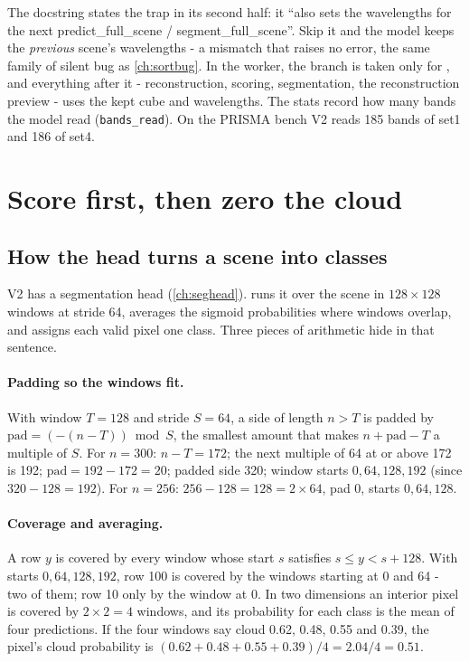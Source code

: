 The docstring states the trap in its second half: it ``also sets the wavelengths for the next predict\_full\_scene /
segment\_full\_scene''. Skip it and the model keeps the \emph{previous} scene's wavelengths - a mismatch that raises no
error, the same family of silent bug as \cref{ch:sortbug}. In the worker, the branch is taken only for
, and everything after it - reconstruction, scoring, segmentation, the reconstruction
preview - uses the kept cube and wavelengths. The stats record how many bands the model read (\texttt{bands\_read}).
On the PRISMA bench V2 reads 185 bands of set1 and 186 of set4.

\section{Score first, then zero the cloud}\label{sec:shipping:order}

\subsection{How the head turns a scene into classes}

V2 has a segmentation head (\cref{ch:seghead}).  runs it over the scene in $128 \times 128$
windows at stride 64, averages the sigmoid probabilities where windows overlap, and assigns each valid pixel one class.
Three pieces of arithmetic hide in that sentence.

\paragraph{Padding so the windows fit.} With window $T = 128$ and stride $S = 64$, a side of length $n > T$ is padded
by $\text{pad} = (-(n - T)) \bmod S$, the smallest amount that makes $n + \text{pad} - T$ a multiple of $S$. For $n =
300$: $n - T = 172$; the next multiple of 64 at or above 172 is 192; $\text{pad} = 192 - 172 = 20$; padded side 320;
window starts $0, 64, 128, 192$ (since $320 - 128 = 192$). For $n = 256$: $256 - 128 = 128 = 2 \times 64$, pad 0,
starts $0, 64, 128$\tagC.

\paragraph{Coverage and averaging.} A row $y$ is covered by every window whose start $s$ satisfies $s \le y < s + 128$.
With starts $0, 64, 128, 192$, row 100 is covered by the windows starting at 0 and 64 - two of them; row 10 only by the
window at 0. In two dimensions an interior pixel is covered by $2 \times 2 = 4$ windows, and its probability for each
class is the mean of four predictions. If the four windows say cloud 0.62, 0.48, 0.55 and 0.39, the pixel's cloud
probability is $(0.62 + 0.48 + 0.55 + 0.39) / 4 = 2.04 / 4 = 0.51$.

